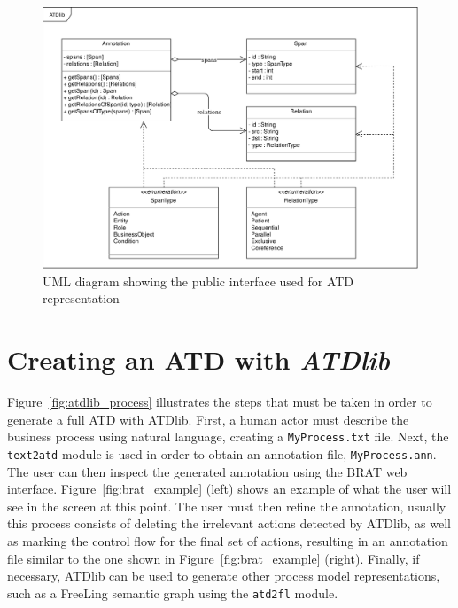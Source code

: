 \begin{figure}[htb]
  \centering
  \includegraphics[width=\textwidth]{figures/atdlib_uml}
  \caption{UML diagram showing the public interface used for ATD representation}
  \label{fig:atdlib_uml}
\end{figure}



\section{Creating an ATD with \emph{ATDlib}}
\label{sec:atdlib_tour}

Figure~\ref{fig:atdlib_process} illustrates the steps that must be taken in
order to generate a full ATD with ATDlib. First, a human actor must describe
the business process using natural language, creating a \texttt{MyProcess.txt}
file. Next, the \texttt{text2atd} module is used in order to obtain an
annotation file, \texttt{MyProcess.ann}. The user can then inspect the generated
annotation using the BRAT web interface. Figure~\ref{fig:brat_example} (left)
shows an example of what the user will see in the screen at this point. The user
must then refine the annotation, usually this process consists of deleting the
irrelevant actions detected by ATDlib, as well as marking the control flow for
the final set of actions, resulting in an annotation file similar to the one
shown in Figure~\ref{fig:brat_example} (right). Finally, if necessary, ATDlib
can be used to generate other process model representations, such as a FreeLing
semantic graph using the \texttt{atd2fl} module.


